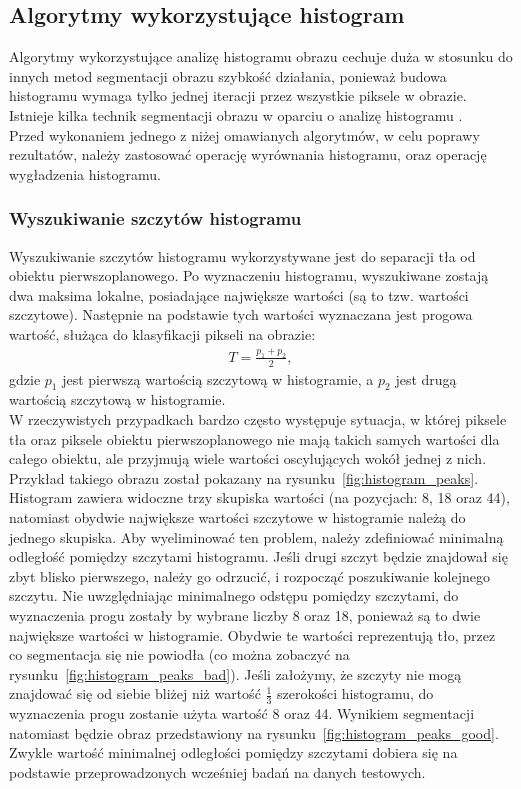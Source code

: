 \subsection{Algorytmy wykorzystujące histogram}
Algorytmy wykorzystujące analizę histogramu obrazu cechuje duża w stosunku do innych metod segmentacji obrazu szybkość działania, ponieważ budowa histogramu wymaga tylko jednej iteracji przez wszystkie piksele w obrazie. Istnieje kilka technik segmentacji obrazu w oparciu o analizę histogramu \cite{phillips93}. \\
Przed wykonaniem jednego z niżej omawianych algorytmów, w celu poprawy rezultatów, należy zastosować operację wyrównania histogramu, oraz operację wygładzenia histogramu.

\subsubsection{Wyszukiwanie szczytów histogramu}\label{sssec:histogram_peaks}
Wyszukiwanie szczytów histogramu wykorzystywane jest do separacji tła od obiektu pierwszoplanowego. Po wyznaczeniu histogramu, wyszukiwane zostają dwa maksima lokalne, posiadające największe wartości (są to tzw. wartości szczytowe). Następnie na podstawie tych wartości wyznaczana jest progowa wartość, służąca do klasyfikacji pikseli na obrazie:
\begin{gather*}
  T = \frac{p_1 + p_2}{2},
\end{gather*}
gdzie $p_1$ jest pierwszą wartością szczytową w histogramie, a $p_2$ jest drugą wartością szczytową w histogramie. \\
W rzeczywistych przypadkach bardzo często występuje sytuacja, w której piksele tła oraz piksele obiektu pierwszoplanowego nie mają takich samych wartości dla całego obiektu, ale przyjmują wiele wartości oscylujących wokół jednej z nich. Przykład takiego obrazu został pokazany na rysunku~\ref{fig:histogram_peaks}. Histogram zawiera widoczne trzy skupiska wartości (na pozycjach: 8, 18 oraz 44), natomiast obydwie największe wartości szczytowe w histogramie należą do jednego skupiska. Aby wyeliminować ten problem, należy zdefiniować minimalną odległość pomiędzy szczytami histogramu. Jeśli drugi szczyt będzie znajdował się zbyt blisko pierwszego, należy go odrzucić, i rozpocząć poszukiwanie kolejnego szczytu. Nie uwzględniając minimalnego odstępu pomiędzy szczytami, do wyznaczenia progu zostały by wybrane liczby 8 oraz 18, ponieważ są to dwie największe wartości w histogramie. Obydwie te wartości reprezentują tło, przez co segmentacja się nie powiodła (co można zobaczyć na rysunku~\ref{fig:histogram_peaks_bad}). Jeśli założymy, że szczyty nie mogą znajdować się od siebie bliżej niż wartość $\frac{1}{3}$ szerokości histogramu, do wyznaczenia progu zostanie użyta wartość 8 oraz 44. Wynikiem segmentacji natomiast będzie obraz przedstawiony na rysunku~\ref{fig:histogram_peaks_good}. Zwykle wartość minimalnej odległości pomiędzy szczytami dobiera się na podstawie przeprowadzonych wcześniej badań na danych testowych.

